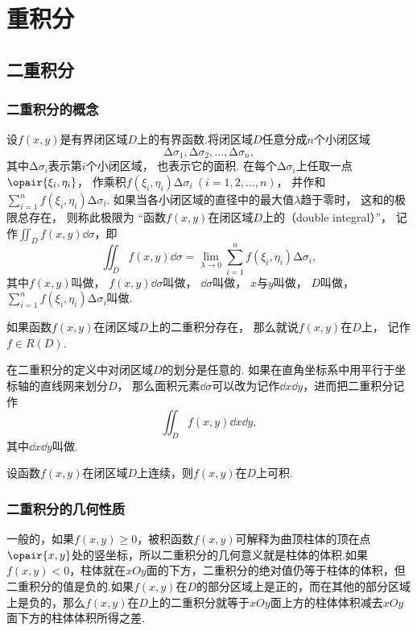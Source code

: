 \chapter{重积分}
\section{二重积分}
\subsection{二重积分的概念}
设\(f(x,y)\)是有界闭区域\(D\)上的有界函数.将闭区域\(D\)任意分成\(n\)个小闭区域\[
\increment\sigma_1,\increment\sigma_2,\dotsc,\increment\sigma_n,
\]其中\(\increment\sigma_i\)表示第\(i\)个小闭区域，
也表示它的面积.
在每个\(\increment\sigma_i\)上任取一点\(\opair{\xi_i,\eta_i}\)，
作乘积\(f(\xi_i,\eta_i) \increment\sigma_i\ (i=1,2,\dotsc,n)\)，
并作和\(\sum\limits_{i=1}^n f(\xi_i,\eta_i) \increment\sigma_i\).
如果当各小闭区域的直径中的最大值\(\lambda\)趋于零时，
这和的极限总存在，
则称此极限为
“函数\(f(x,y)\)在闭区域\(D\)上的（double integral）”，
记作\(\iint_D f(x,y) \dd{\sigma}\)，即
\[
	\iint_D f(x,y) \dd{\sigma}
	= \lim\limits_{\lambda\to0}
	\sum\limits_{i=1}^n f(\xi_i,\eta_i) \increment\sigma_i,
\]
其中\(f(x,y)\)叫做，
\(f(x,y) \dd{\sigma}\)叫做，
\(\dd{\sigma}\)叫做，
\(x\)与\(y\)叫做，
\(D\)叫做，
\(\sum\limits_{i=1}^n f(\xi_i,\eta_i) \increment\sigma_i\)叫做.

如果函数\(f(x,y)\)在闭区域\(D\)上的二重积分存在，
那么就说\(f(x,y)\)在\(D\)上，
记作\(f \in R(D)\).

在二重积分的定义中对闭区域\(D\)的划分是任意的.
如果在直角坐标系中用平行于坐标轴的直线网来划分\(D\)，
那么面积元素\(\dd{\sigma}\)可以改为记作\(\dd{x}\dd{y}\)，进而把二重积分记作\[
\iint_{D}{f(x,y)\dd{x}\dd{y}},
\]其中\(\dd{x}\dd{y}\)叫做.

\begin{theorem}[充分条件]
设函数\(f(x,y)\)在闭区域\(D\)上连续，则\(f(x,y)\)在\(D\)上可积.
\end{theorem}

\subsection{二重积分的几何性质}
一般的，如果\(f(x,y) \geq 0\)，被积函数\(f(x,y)\)可解释为曲顶柱体的顶在点\(\opair{x,y}\)处的竖坐标，所以二重积分的几何意义就是柱体的体积.如果\(f(x,y) < 0\)，柱体就在\(xOy\)面的下方，二重积分的绝对值仍等于柱体的体积，但二重积分的值是负的.如果\(f(x,y)\)在\(D\)的部分区域上是正的，而在其他的部分区域上是负的，那么\(f(x,y)\)在\(D\)上的二重积分就等于\(xOy\)面上方的柱体体积减去\(xOy\)面下方的柱体体积所得之差.

